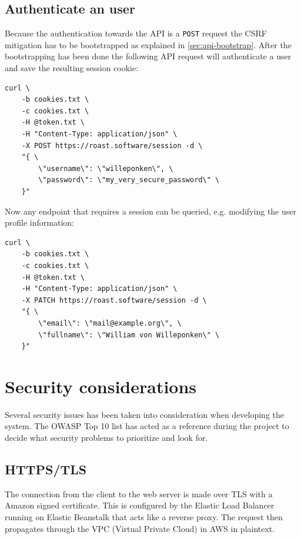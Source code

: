 \documentclass[12pt,a4paper]{report}
\begin{document}
\section{Authenticate an user}
Because the authentication towards the API is a \texttt{POST} request the CSRF mitigation has to be bootstrapped as explained in \autoref{sec:api-bootstrap}. After the bootstrapping has been done the following API request will authenticate a user and save the resulting session cookie:
\begin{verbatim}
curl \
    -b cookies.txt \
    -c cookies.txt \
    -H @token.txt \
    -H "Content-Type: application/json" \
    -X POST https://roast.software/session -d \
    "{ \
        \"username\": \"willeponken\", \
        \"password\": \"my_very_secure_password\" \
    }"
\end{verbatim}

Now any endpoint that requires a session can be queried, e.g. modifying the user profile information:
\begin{verbatim}
curl \
    -b cookies.txt \
    -c cookies.txt \
    -H @token.txt \
    -H "Content-Type: application/json" \
    -X PATCH https://roast.software/session -d \
    "{ \
        \"email\": \"mail@example.org\", \
        \"fullname\": \"William von Willeponken\" \
    }"
\end{verbatim}


\newpage

\chapter{Security considerations}
Several security issues has been taken into consideration when developing the system. The OWASP Top 10 list\cite{owasp-top-10} has acted as a reference during the project to decide what security problems to prioritize and look for.

\section{HTTPS/TLS}
The connection from the client to the web server is made over TLS with a Amazon signed certificate.
This is configured by the Elastic Load Balancer running on Elastic Beanstalk that acts like a reverse proxy.
The request then propagates through the VPC (Virtual Private Cloud) in AWS in plaintext.
\end{document}

